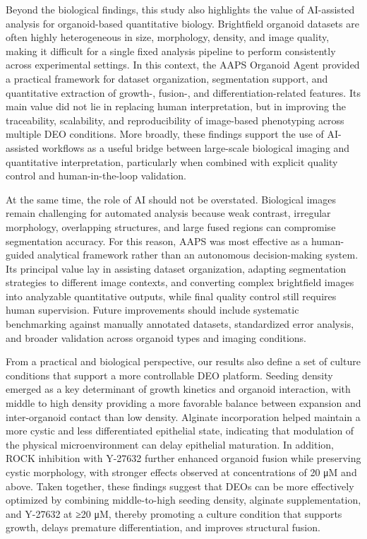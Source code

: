 \documentclass[
]{article}
\begin{document}
Beyond the biological findings, this study also highlights the value of AI-assisted analysis for organoid-based quantitative biology. Brightfield organoid datasets are often highly heterogeneous in size, morphology, density, and image quality, making it difficult for a single fixed analysis pipeline to perform consistently across experimental settings. In this context, the AAPS Organoid Agent provided a practical framework for dataset organization, segmentation support, and quantitative extraction of growth-, fusion-, and differentiation-related features. Its main value did not lie in replacing human interpretation, but in improving the traceability, scalability, and reproducibility of image-based phenotyping across multiple DEO conditions. More broadly, these findings support the use of AI-assisted workflows as a useful bridge between large-scale biological imaging and quantitative interpretation, particularly when combined with explicit quality control and human-in-the-loop validation.

At the same time, the role of AI should not be overstated. Biological images remain challenging for automated analysis because weak contrast, irregular morphology, overlapping structures, and large fused regions can compromise segmentation accuracy. For this reason, AAPS was most effective as a human-guided analytical framework rather than an autonomous decision-making system. Its principal value lay in assisting dataset organization, adapting segmentation strategies to different image contexts, and converting complex brightfield images into analyzable quantitative outputs, while final quality control still requires human supervision. Future improvements should include systematic benchmarking against manually annotated datasets, standardized error analysis, and broader validation across organoid types and imaging conditions.

From a practical and biological perspective, our results also define a set of culture conditions that support a more controllable DEO platform. Seeding density emerged as a key determinant of growth kinetics and organoid interaction, with middle to high density providing a more favorable balance between expansion and inter-organoid contact than low density. Alginate incorporation helped maintain a more cystic and less differentiated epithelial state, indicating that modulation of the physical microenvironment can delay epithelial maturation. In addition, ROCK inhibition with Y-27632 further enhanced organoid fusion while preserving cystic morphology, with stronger effects observed at concentrations of 20 μM and above. Taken together, these findings suggest that DEOs can be more effectively optimized by combining middle-to-high seeding density, alginate supplementation, and Y-27632 at ≥20 μM, thereby promoting a culture condition that supports growth, delays premature differentiation, and improves structural fusion.
\end{document}
